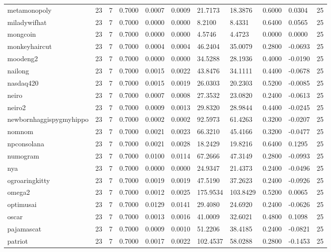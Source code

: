 \begin{table}[htbp]
\begin{tabular}{lllllllllll}
metamonopoly & 23 & 7 & 0.7000 & 0.0007 & 0.0009 & 21.7173 & 18.3876 & 0.6000 & 0.0304 & 25 \\
miladywifhat & 23 & 7 & 0.7000 & 0.0000 & 0.0000 & 8.2100 & 8.4331 & 0.6400 & 0.0565 & 25 \\
mongcoin & 23 & 7 & 0.7000 & 0.0000 & 0.0000 & 4.5746 & 4.4723 & 0.0000 & 0.0000 & 25 \\
monkeyhaircut & 23 & 7 & 0.7000 & 0.0004 & 0.0004 & 46.2404 & 35.0079 & 0.2800 & -0.0693 & 25 \\
moodeng2 & 23 & 7 & 0.7000 & 0.0000 & 0.0000 & 34.5288 & 28.1936 & 0.4000 & -0.0190 & 25 \\
nailong & 23 & 7 & 0.7000 & 0.0015 & 0.0022 & 43.8476 & 34.1111 & 0.4400 & -0.0678 & 25 \\
nasdaq420 & 23 & 7 & 0.7000 & 0.0015 & 0.0019 & 26.0303 & 20.2303 & 0.5200 & -0.0085 & 25 \\
neiro & 23 & 7 & 0.7000 & 0.0007 & 0.0008 & 27.3532 & 23.0820 & 0.2400 & -0.0613 & 25 \\
neiro2 & 23 & 7 & 0.7000 & 0.0009 & 0.0013 & 29.8320 & 28.9844 & 0.4400 & -0.0245 & 25 \\
newbornhaggispygmyhippo & 23 & 7 & 0.7000 & 0.0002 & 0.0002 & 92.5973 & 61.4263 & 0.3200 & -0.0207 & 25 \\
nomnom & 23 & 7 & 0.7000 & 0.0021 & 0.0023 & 66.3210 & 45.4166 & 0.3200 & -0.0477 & 25 \\
npconsolana & 23 & 7 & 0.7000 & 0.0021 & 0.0028 & 18.2429 & 19.8216 & 0.6400 & 0.1295 & 25 \\
numogram & 23 & 7 & 0.7000 & 0.0100 & 0.0114 & 67.2666 & 47.3149 & 0.2800 & -0.0993 & 25 \\
nya & 23 & 7 & 0.7000 & 0.0000 & 0.0000 & 24.9347 & 21.4373 & 0.2400 & -0.0496 & 25 \\
ogroaringkitty & 23 & 7 & 0.7000 & 0.0019 & 0.0019 & 47.5190 & 37.2623 & 0.2400 & -0.0926 & 25 \\
omega2 & 23 & 7 & 0.7000 & 0.0012 & 0.0025 & 175.9534 & 103.8429 & 0.5200 & 0.0065 & 25 \\
optimusai & 23 & 7 & 0.7000 & 0.0129 & 0.0141 & 29.4080 & 24.6920 & 0.2400 & -0.0626 & 25 \\
oscar & 23 & 7 & 0.7000 & 0.0013 & 0.0016 & 41.0009 & 32.6021 & 0.4800 & 0.1098 & 25 \\
pajamascat & 23 & 7 & 0.7000 & 0.0009 & 0.0010 & 51.2206 & 38.4185 & 0.2400 & -0.0821 & 25 \\
patriot & 23 & 7 & 0.7000 & 0.0017 & 0.0022 & 102.4537 & 58.0288 & 0.2800 & -0.1453 & 25 \\

\end{tabular}
\end{table}
